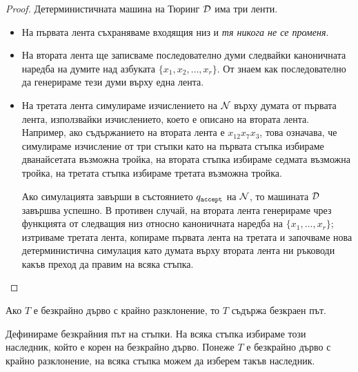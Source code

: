 \begin{proof}
  Детерминистичната машина на Тюринг $\mathcal{D}$ има три ленти.
  \begin{itemize}
  \item 
    На първата лента съхраняваме входящия низ и {\em тя никога не се променя}.
  \item
    На втората лента ще записваме последователно думи следвайки каноничната наредба на 
    думите над азбуката $\{x_1,x_2,\dots,x_r\}$.
    От  знаем как последователно да генерираме тези думи върху една лента.
  \item
    На третата лента симулираме изчислението на $\mathcal{N}$ върху думата от първата лента, използвайки изчислението, 
    което е описано на втората лента. Например, ако съдържанието на втората лента е $x_{12}x_7x_3$,
    това означава, че симулираме изчисление от три стъпки като на първата стъпка избираме дванайсетата
    възможна тройка, на втората стъпка избираме седмата възможна тройка, на третата стъпка избираме третата възможна тройка.
    
    Ако симулацията завърши в състоянието $q_{\texttt{accept}}$ на $\mathcal{N}$, то машината $\mathcal{D}$ завършва успешно.
    В противен случай, на втората лента генерираме чрез функцията от  следващия низ относно каноничната наредба на $\{x_1,\dots,x_r\}$;
    изтриваме третата лента, копираме първата лента на третата и започваме нова детерминистична симулация като думата върху втората лента ни ръководи какъв преход да правим на всяка стъпка.
  \end{itemize}
\end{proof}

\begin{prop}
  Ако $T$ е безкрайно дърво с крайно разклонение, то $T$ съдържа безкраен път.
\end{prop}
\begin{hint}
  Дефинираме безкрайния път на стъпки.
  На всяка стъпка избираме този наследник, който е корен на безкрайно дърво.
  Понеже $T$ е безкрайно дърво с крайно разклонение, на всяка стъпка можем да изберем такъв наследник.
\end{hint}

